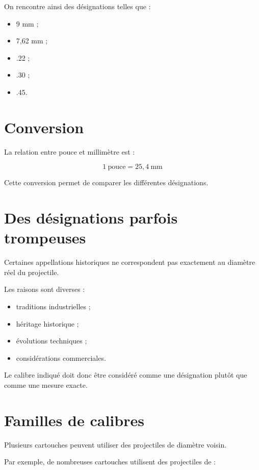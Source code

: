 On rencontre ainsi des désignations telles que :

\begin{itemize}
    \item 9 mm ;
    \item 7,62 mm ;
    \item .22 ;
    \item .30 ;
    \item .45.
\end{itemize}

\section{Conversion}

La relation entre pouce et millimètre est :

\begin{equation}
1~\text{pouce}=25,4~\text{mm}
\end{equation}

Cette conversion permet de comparer les différentes désignations.

\section{Des désignations parfois trompeuses}

Certaines appellations historiques ne correspondent pas exactement au
diamètre réel du projectile.

Les raisons sont diverses :

\begin{itemize}
    \item traditions industrielles ;
    \item héritage historique ;
    \item évolutions techniques ;
    \item considérations commerciales.
\end{itemize}

Le calibre indiqué doit donc être considéré comme une désignation plutôt que
comme une mesure exacte.

\section{Familles de calibres}

Plusieurs cartouches peuvent utiliser des projectiles de diamètre voisin.

Par exemple, de nombreuses cartouches utilisent des projectiles de :

